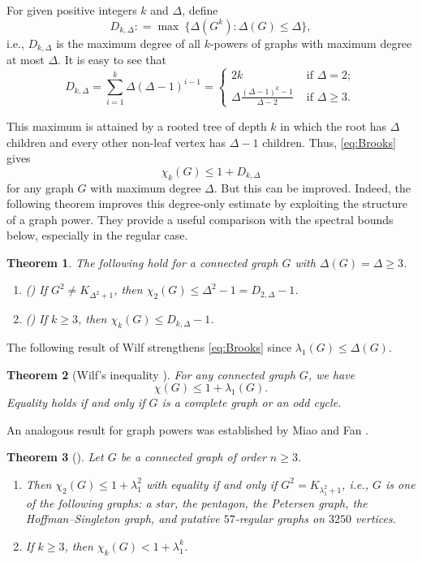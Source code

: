 \documentclass[10pt,a4paper]{article}
\theoremstyle{plain}
\newtheorem{theorem}{Theorem}[section]
\numberwithin{equation}{section}
\begin{document}
For given positive integers $k$ and $\Delta$, define 
\[ D_{k, \Delta}: = \max\ \{\Delta(G^k): \Delta(G)\le \Delta\},\]
i.e., $D_{k, \Delta}$ is the maximum degree of all $k$-powers of graphs with maximum degree at most $\Delta$. It is easy to see that 
\[ D_{k, \Delta} = \sum_{i=1}^k \Delta(\Delta - 1)^{i-1} =
\begin{cases}
  2k & \text{ if }\Delta =2;\\
  \Delta \frac{(\Delta-1)^k - 1}{\Delta - 2} & \text{ if }\Delta \ge 3.
\end{cases} \]

This maximum is attained by a rooted tree of depth $k$ in which the root has $\Delta$ children and every other non-leaf vertex has $\Delta-1$ children. Thus, \eqref{eq:Brooks} gives
\[\chi_k(G)\le 1 + D_{k, \Delta}\]
for any graph $G$ with maximum degree $\Delta$. But this can be improved. Indeed, the following theorem improves this degree-only estimate by exploiting the structure of a graph power. They provide a useful comparison with the spectral bounds below, especially in the regular case.

\begin{theorem} The following hold for a connected graph $G$ with $\Delta(G) = \Delta \ge 3$.  
\begin{enumerate}[$(i)$]
    \item (\cite{Cranston_Rabern_2016}) If $G^2 \neq K_{\Delta^2 +1}$, then $\chi_2(G)\le \Delta^2 -1 = D_{2, \Delta}-1$.
    \item (\cite{Bonamy_Bousquet_2014}) If $k\ge 3$, then $\chi_k(G)\le D_{k, \Delta} - 1$.
\end{enumerate}
\end{theorem}

The following result of Wilf \cite{Wilf_1967} strengthens \eqref{eq:Brooks} since $\lambda_1(G)\le \Delta(G)$.
 
\begin{theorem}[Wilf's inequality \cite{Wilf_1967}]\label{thm:Wilf}
For any connected graph $G$, we have 
    \[ \chi(G) \le 1 + \lambda_1(G).\]
Equality holds if and only if $G$ is a complete graph or an odd cycle.  
\end{theorem}

An analogous result for graph powers was established by Miao and Fan \cite{Miao_Fan_2014}.

\begin{theorem}[\cite{Miao_Fan_2014}]\label{thm:wilf_type_bound_graph_powers}
        Let $G$ be a connected graph of order $n\ge 3$. 
    \begin{enumerate}[$(i)$]
        \item Then $\chi_2(G)\le 1 + \lambda_1^2$ with equality if and only if $G^2 = K_{\lambda_1^2 + 1}$, i.e., $G$ is one of the following graphs: a star, the pentagon, the Petersen graph, the Hoffman--Singleton graph, and putative $57$-regular graphs on $3250$ vertices. 
        \item If $k\ge 3$, then $\chi_k(G) < 1 + \lambda_1^k$. 
    \end{enumerate}
\end{theorem}
\end{document}
